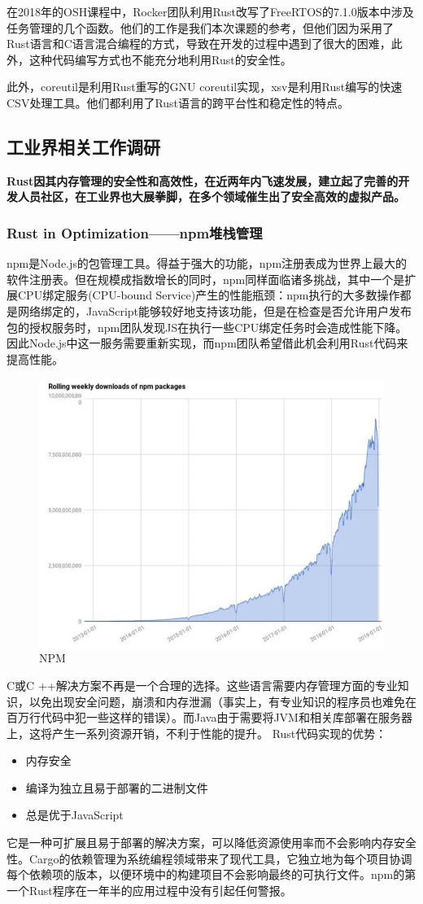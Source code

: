 \documentclass[12pt, a4paper]{article}
\begin{document}
	在2018年的OSH课程中，Rocker团队利用Rust改写了FreeRTOS的7.1.0版本中涉及任务管理的几个函数。他们的工作是我们本次课题的参考，但他们因为采用了Rust语言和C语言混合编程的方式，导致在开发的过程中遇到了很大的困难，此外，这种代码编写方式也不能充分地利用Rust的安全性。
	
	此外，coreutil是利用Rust重写的GNU coreutil实现，xsv是利用Rust编写的快速CSV处理工具。他们都利用了Rust语言的跨平台性和稳定性的特点。
	\subsection{工业界相关工作调研}
	\textbf{Rust因其内存管理的安全性和高效性，在近两年内飞速发展，建立起了完善的开发人员社区，在工业界也大展拳脚，在多个领域催生出了安全高效的虚拟产品。}
	\subsubsection{Rust in Optimization——npm堆栈管理}
		
		
		npm是Node.js的包管理工具。得益于强大的功能，npm注册表成为世界上最大的软件注册表。但在规模成指数增长的同时，npm同样面临诸多挑战，其中一个是扩展CPU绑定服务(CPU-bound Service)产生的性能瓶颈：npm执行的大多数操作都是网络绑定的，JavaScript能够较好地支持该功能，但是在检查是否允许用户发布包的授权服务时，npm团队发现JS在执行一些CPU绑定任务时会造成性能下降。因此Node.js中这一服务需要重新实现，而npm团队希望借此机会利用Rust代码来提高性能。
		\begin{figure}[H]
			\centering
			\includegraphics[width=0.7\linewidth]{Z1}
			\caption{NPM}
			\label{fig:southeast}
		\end{figure}
		C或C ++解决方案不再是一个合理的选择。这些语言需要内存管理方面的专业知识，以免出现安全问题，崩溃和内存泄漏（事实上，有专业知识的程序员也难免在百万行代码中犯一些这样的错误）。而Java由于需要将JVM和相关库部署在服务器上，这将产生一系列资源开销，不利于性能的提升。
		Rust代码实现的优势：
		\begin{itemize} 
		\item 内存安全
		\item 编译为独立且易于部署的二进制文件
		\item 总是优于JavaScript
		\end{itemize}
		它是一种可扩展且易于部署的解决方案，可以降低资源使用率而不会影响内存安全性。Cargo的依赖管理为系统编程领域带来了现代工具，它独立地为每个项目协调每个依赖项的版本，以便环境中的构建项目不会影响最终的可执行文件。npm的第一个Rust程序在一年半的应用过程中没有引起任何警报。
		
\end{document}
